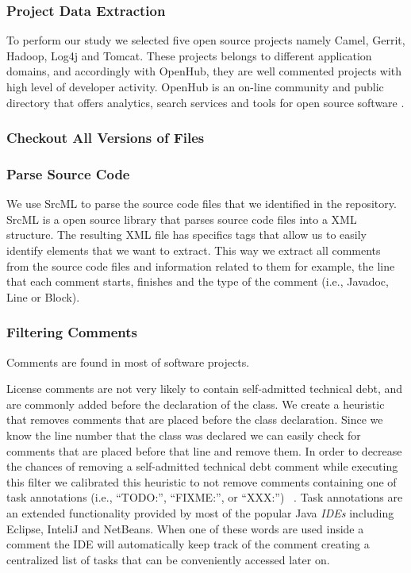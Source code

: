 
\subsubsection*{Project Data Extraction}
\label{subsub:project_data_extraction}

To perform our study we selected five open source projects namely Camel, Gerrit, Hadoop, Log4j and Tomcat. These projects belongs to different application domains, and accordingly with OpenHub, they are well commented projects  with high level of developer activity. OpenHub is an on-line community and public directory that offers analytics, search services and tools for open source software \cite{Openhub:home}.

\subsubsection*{Checkout All Versions of Files}
\label{subsub:checkout_all_versions_of_files}

\subsubsection*{Parse Source Code}
\label{subsub:parse_source_code}

We use SrcML \cite{srcml} to parse the source code files that we identified in the repository. SrcML is a open source library that parses source code files into a XML structure. The resulting XML file has specifics tags that allow us to easily identify elements that we want to extract. This way we extract all comments from the source code files and information related to them for example, the line that each comment starts, finishes and the type of the comment (i.e., Javadoc, Line or Block).

\subsubsection*{Filtering Comments}
\label{subsub:filtering_comments}

Comments are found in most of software projects.

License comments are not very likely to contain self-admitted technical debt, and are commonly added before the declaration of the class. We create a heuristic that removes comments that are placed before the class declaration. Since we know the line number that the class was declared we can easily check for comments that are placed before that line and remove them. In order to decrease the chances of removing a self-admitted technical debt comment while executing this filter we calibrated this heuristic to not remove comments containing one of task annotations (i.e., ``TODO:'', ``FIXME:'', or ``XXX:'') ~\cite{Storey2008ICSE}. Task annotations are an extended functionality provided by most of the popular Java \textit{IDEs} including Eclipse, InteliJ and NetBeans. When one of these words are used inside a comment the IDE will automatically keep track of the comment creating a centralized list of tasks that can be conveniently accessed later on.

